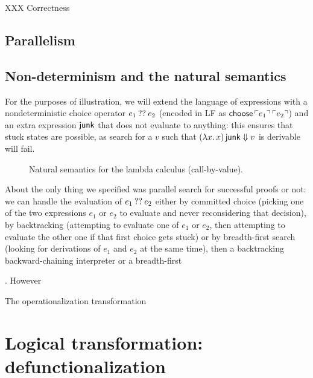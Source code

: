 XXX Correctness

\subsection{Parallelism}
\label{sec:trans-par}

\subsection{Non-determinism and the natural semantics}

For the purposes of illustration, we will extend the language of
expressions with a nondeterministic choice operator $e_1 \mathbin{??} e_2$
(encoded in LF as ${\sf choose}\,{\ulcorner{e_1}\urcorner}\,{\ulcorner{e_2}\urcorner}$) and an
extra expression ${\sf junk}$ that does not evaluate to anything: this
ensures that stuck states are possible, as search for a $v$ such that
$(\lambda x.\,x)\,{\sf junk} \Downarrow v$ is derivable will fail.

\begin{figure}[t]
\begin{minipage}[b]{0.45\linewidth}
\end{minipage}
\hspace{0.5cm}
\begin{minipage}[b]{0.55\linewidth}
\end{minipage}
\caption{Natural semantics for the lambda calculus (call-by-value).}
\label{fig:ns-arb}
\end{figure}

About the only thing we specified was parallel search for successful
proofs or not: we can handle the evaluation of $e_1 \mathbin{??} e_2$ either
by committed choice (picking one of the two expressions $e_1$ or $e_2$
to evaluate and never reconsidering that decision), by backtracking
(attempting to evaluate one of $e_1$ or $e_2$, then attempting to
evaluate the other one if that first choice gets stuck) or by
breadth-first search (looking for derivations of $e_1$ and $e_2$ at
the same time), then a backtracking backward-chaining interpreter or a
breadth-first

. However

The operationalization transformation 



\section{Logical transformation: defunctionalization}
\label{sec:defunctionalization}

